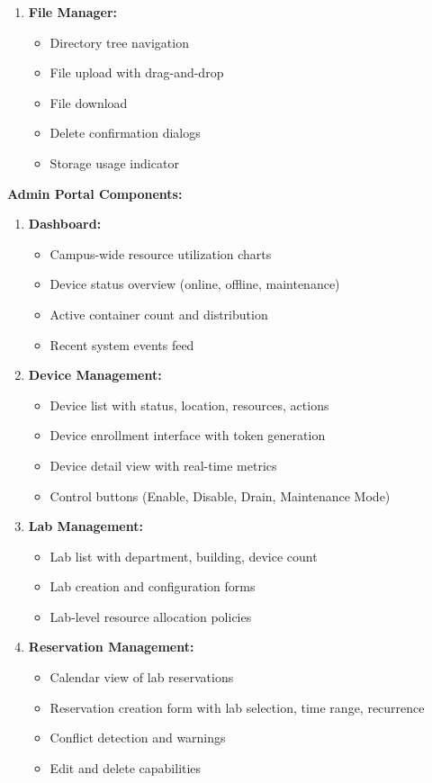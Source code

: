 \documentclass[12pt,a4paper]{article}
\begin{document}
\begin{enumerate}
    \item \textbf{File Manager:}
    \begin{itemize}
        \item Directory tree navigation
        \item File upload with drag-and-drop
        \item File download
        \item Delete confirmation dialogs
        \item Storage usage indicator
    \end{itemize}
\end{enumerate}
\textbf{Admin Portal Components:}

\begin{enumerate}
    \item \textbf{Dashboard:}
    \begin{itemize}
        \item Campus-wide resource utilization charts
        \item Device status overview (online, offline, maintenance)
        \item Active container count and distribution
        \item Recent system events feed
    \end{itemize}
    
    \item \textbf{Device Management:}
    \begin{itemize}
        \item Device list with status, location, resources, actions
        \item Device enrollment interface with token generation
        \item Device detail view with real-time metrics
        \item Control buttons (Enable, Disable, Drain, Maintenance Mode)
    \end{itemize}
    
    \item \textbf{Lab Management:}
    \begin{itemize}
        \item Lab list with department, building, device count
        \item Lab creation and configuration forms
        \item Lab-level resource allocation policies
    \end{itemize}
    
    \item \textbf{Reservation Management:}
    \begin{itemize}
        \item Calendar view of lab reservations
        \item Reservation creation form with lab selection, time range, recurrence
        \item Conflict detection and warnings
        \item Edit and delete capabilities
    \end{itemize}
    

\end{enumerate}
\end{document}
